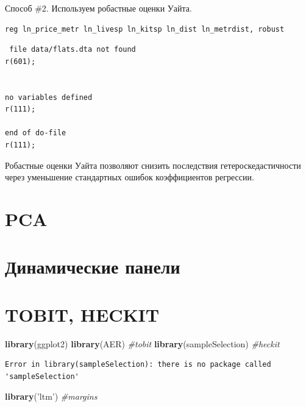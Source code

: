 \documentclass[]{book}
\newenvironment{Shaded}{\begin{snugshade}}{\end{snugshade}}
\newcommand{\CommentTok}[1]{\textcolor[rgb]{0.56,0.35,0.01}{\textit{#1}}}
\newcommand{\KeywordTok}[1]{\textcolor[rgb]{0.13,0.29,0.53}{\textbf{#1}}}
\newcommand{\NormalTok}[1]{#1}
\newcommand{\StringTok}[1]{\textcolor[rgb]{0.31,0.60,0.02}{#1}}
\begin{document}
Способ \#2. Используем робастные оценки Уайта.

\begin{verbatim}
reg ln_price_metr ln_livesp ln_kitsp ln_dist ln_metrdist, robust
\end{verbatim}

\begin{verbatim}
 file data/flats.dta not found
r(601);


no variables defined
r(111);

end of do-file
r(111);
\end{verbatim}

Робастные оценки Уайта позволяют снизить последствия гетероскедастичности через уменьшение стандартных ошибок коэффициентов регрессии.

\hypertarget{pca}{%
\chapter{PCA}\label{pca}}

\hypertarget{dinpanel}{%
\chapter{Динамические панели}\label{dinpanel}}

\hypertarget{tobit_heckit}{%
\chapter{TOBIT, HECKIT}\label{tobit_heckit}}

\begin{Shaded}
\begin{Highlighting}[]
\KeywordTok{library}\NormalTok{(ggplot2)}
\KeywordTok{library}\NormalTok{(AER) }\CommentTok{#tobit}
\KeywordTok{library}\NormalTok{(sampleSelection) }\CommentTok{#heckit}
\end{Highlighting}
\end{Shaded}

\begin{verbatim}
Error in library(sampleSelection): there is no package called 'sampleSelection'
\end{verbatim}

\begin{Shaded}
\begin{Highlighting}[]
\KeywordTok{library}\NormalTok{(}\StringTok{'ltm'}\NormalTok{) }\CommentTok{#margins}
\end{Highlighting}
\end{Shaded}
\end{document}
